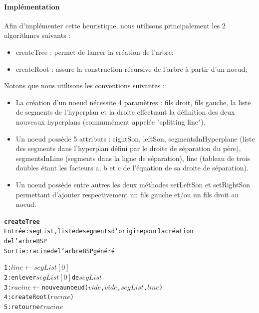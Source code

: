 \documentclass[11pt,a4paper]{article}
\theoremstyle{definition}
\theoremstyle{remark}
\begin{document}
\paragraph{Implémentation}

Afin d'implémenter cette heuristique, nous utilisons principalement les 2 algorithmes suivants :
\begin{itemize}
\item createTree : permet de lancer la création de l'arbre;
\item createRoot : assure la construction récursive de l'arbre à partir d'un noeud;
\end{itemize}

Notons que nous utilisons les conventions suivantes :
\begin{itemize}
\item La création d'un noeud nécessite 4 paramètres : fils droit, fils gauche, la liste de segments de l'hyperplan et la droite effectuant la définition des deux nouveaux hyperplans (communément appelée "splitting line").
\item Un noeud possède 5 attributs : rightSon, leftSon, segmentsInHyperplane (liste des segments dans l'hyperplan défini par le droite de séparation du père), segmentsInLine (segments dans la ligne de séparation), line (tableau de trois doubles étant les facteurs a, b et c de l'équation de sa droite de séparation).
\item Un noeud possède entre autres les deux méthodes setLeftSon et setRightSon permettant d'ajouter respectivement un fils gauche et/ou un fils droit au noeud. 
\end{itemize}

\begin{alltt}
\textbf{createTree}
Entrée : segList, liste de segments d'origine pour la création 
de l'arbre BSP
Sortie : racine de l'arbre BSP généré

1: \(line \leftarrow segList[0]\)
2: enlever \(segList[0]\) de \(segList\)
3: \(racine\) \(\leftarrow\) nouveau noeud (\(vide\), \(vide\), \(segList\), \(line\))
4: createRoot(\(racine\))
5: retourner \(racine\)
\end{alltt}
\end{document}
